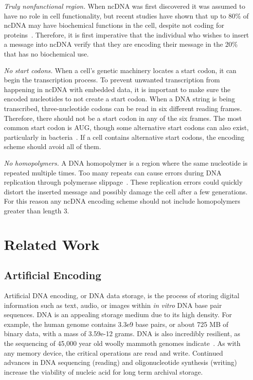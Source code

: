 \documentclass{bioinfo}
\begin{document}
\textit{Truly nonfunctional region.} When ncDNA was first discovered it was assumed to have no role in cell functionality, but recent studies have shown that up to 80\% of ncDNA may have biochemical functions in the cell, despite not coding for proteins~\cite{EPC2012N}. Therefore, it is first imperative that the individual who wishes to insert a message into ncDNA verify that they are encoding their message in the 20\% that has no biochemical use.

\textit{No start codons.} When a cell's genetic machinery locates a start codon, it can begin the transcription process. To prevent unwanted transcription from happening in ncDNA with embedded data, it is important to make sure the encoded nucleotides to not create a start codon. When a DNA string is being transcribed, three-nucleotide codons can be read in six different reading frames. Therefore, there should not be a start codon in any of the six frames. The most common start codon is AUG, though some alternative start codons can also exist, particularly in bacteria~\cite{B1997S}. If a cell contains alternative start codons, the encoding scheme should avoid all of them.

\textit{No homopolymers.} A DNA homopolymer is a region where the same nucleotide is repeated multiple times. Too many repeats can cause errors during DNA replication through polymerase slippage~\cite{VCE2001TEJ}. These replication errors could quickly distort the inserted message and possibly damage the cell after a few generations. For this reason any ncDNA encoding scheme should not include homopolymers greater than length 3.

\section{Related Work}

\subsection{Artificial Encoding}

Artificial DNA encoding, or DNA data storage, is the process of storing digital information such as text, audio, or images within \textit{in vitro} DNA base pair sequences. DNA is an appealing storage medium due to its high density. For example, the human genome contains 3.3e9 base pairs, or about 725 MB of binary data, with a mass of 3.59e-12 grams. DNA is also incredibly resilient, as the sequencing of 45,000 year old woolly mammoth genomes indicate~\cite{PALKOPOULOU2015}. As with any memory device, the critical operations are read and write. Continued advances in DNA sequencing (reading) and oligonucleotide synthesis (writing) increase the viability of nucleic acid for long term archival storage.
\end{document}
